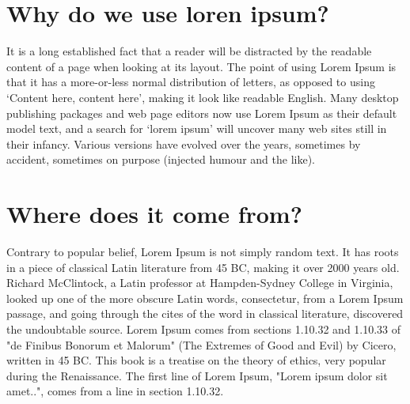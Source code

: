 \nomenclature[g-p]{$\pi$}{ $\simeq 3.14\ldots$}                                             %


\section{Why do we use loren ipsum?} %


It is a long established fact that a reader will be distracted by the readable content of a page when looking at its layout. The point of using Lorem Ipsum is that it has a more-or-less normal distribution of letters, as opposed to using `Content here, content here', making it look like readable English. Many desktop publishing packages and web page editors now use Lorem Ipsum as their default model text, and a search for `lorem ipsum' will uncover many web sites still in their infancy. Various versions have evolved over the years, sometimes by accident, sometimes on purpose (injected humour and the like).

\section{Where does it come from?}  %
\label{section1.3}

Contrary to popular belief, Lorem Ipsum is not simply random text. It has roots in a piece of classical Latin literature from 45 BC, making it over 2000 years old. Richard McClintock, a Latin professor at Hampden-Sydney College in Virginia, looked up one of the more obscure Latin words, consectetur, from a Lorem Ipsum passage, and going through the cites of the word in classical literature, discovered the undoubtable source. Lorem Ipsum comes from sections 1.10.32 and 1.10.33 of "de Finibus Bonorum et Malorum" (The Extremes of Good and Evil) by Cicero, written in 45 BC. This book is a treatise on the theory of ethics, very popular during the Renaissance. The first line of Lorem Ipsum, "Lorem ipsum dolor sit amet..", comes from a line in section 1.10.32.

